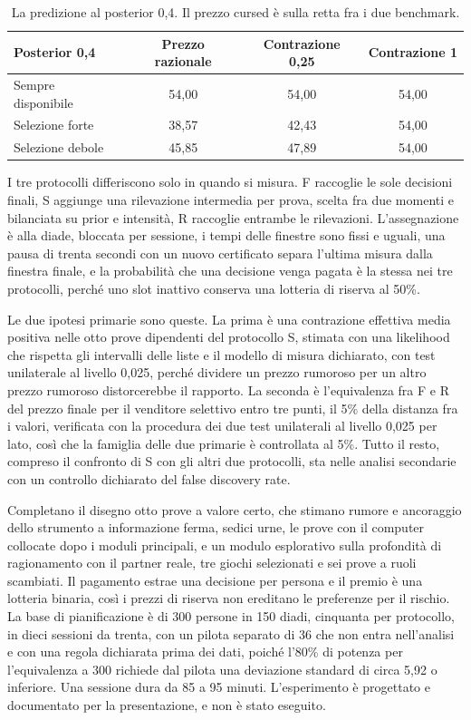 \documentclass[11pt,a4paper]{article}
\begin{document}
\begin{table}[ht]
\centering
\begin{tabular}{lccc}
\toprule
Posterior 0,4 & Prezzo razionale & Contrazione 0,25 & Contrazione 1\\
\midrule
Sempre disponibile & 54,00 & 54,00 & 54,00\\
Selezione forte & 38,57 & 42,43 & 54,00\\
Selezione debole & 45,85 & 47,89 & 54,00\\
\bottomrule
\end{tabular}
\caption{La predizione al posterior 0,4. Il prezzo cursed \`e sulla retta fra i due benchmark.}
\end{table}

I tre protocolli differiscono solo in quando si misura. F raccoglie le sole decisioni finali, S aggiunge una rilevazione intermedia per prova, scelta fra due momenti e bilanciata su prior e intensit\`a, R raccoglie entrambe le rilevazioni. L'assegnazione \`e alla diade, bloccata per sessione, i tempi delle finestre sono fissi e uguali, una pausa di trenta secondi con un nuovo certificato separa l'ultima misura dalla finestra finale, e la probabilit\`a che una decisione venga pagata \`e la stessa nei tre protocolli, perch\'e uno slot inattivo conserva una lotteria di riserva al 50\%.

Le due ipotesi primarie sono queste. La prima \`e una contrazione effettiva media positiva nelle otto prove dipendenti del protocollo S, stimata con una likelihood che rispetta gli intervalli delle liste e il modello di misura dichiarato, con test unilaterale al livello 0,025, perch\'e dividere un prezzo rumoroso per un altro prezzo rumoroso distorcerebbe il rapporto. La seconda \`e l'equivalenza fra F e R del prezzo finale per il venditore selettivo entro tre punti, il 5\% della distanza fra i valori, verificata con la procedura dei due test unilaterali al livello 0,025 per lato, cos\`i che la famiglia delle due primarie \`e controllata al 5\%. Tutto il resto, compreso il confronto di S con gli altri due protocolli, sta nelle analisi secondarie con un controllo dichiarato del false discovery rate.

Completano il disegno otto prove a valore certo, che stimano rumore e ancoraggio dello strumento a informazione ferma, sedici urne, le prove con il computer collocate dopo i moduli principali, e un modulo esplorativo sulla profondit\`a di ragionamento con il partner reale, tre giochi selezionati e sei prove a ruoli scambiati. Il pagamento estrae una decisione per persona e il premio \`e una lotteria binaria, cos\`i i prezzi di riserva non ereditano le preferenze per il rischio. La base di pianificazione \`e di 300 persone in 150 diadi, cinquanta per protocollo, in dieci sessioni da trenta, con un pilota separato di 36 che non entra nell'analisi e con una regola dichiarata prima dei dati, poich\'e l'80\% di potenza per l'equivalenza a 300 richiede dal pilota una deviazione standard di circa 5,92 o inferiore. Una sessione dura da 85 a 95 minuti. L'esperimento \`e progettato e documentato per la presentazione, e non \`e stato eseguito.
\end{document}
